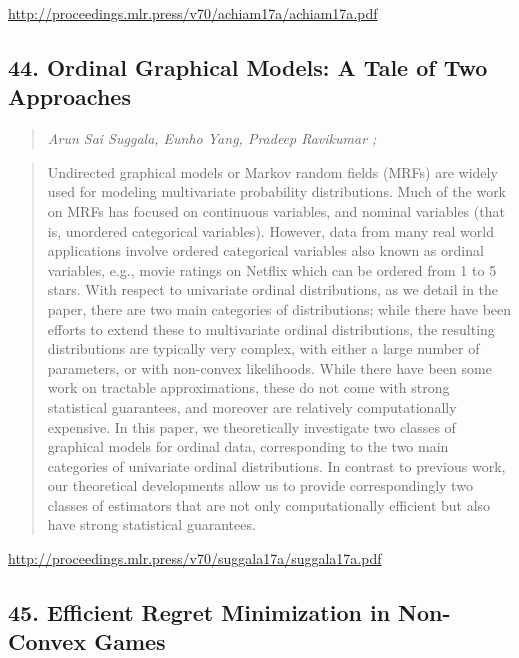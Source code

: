 \documentclass{article}
\begin{document}
\href{http://proceedings.mlr.press/v70/achiam17a/achiam17a.pdf}{http://proceedings.mlr.press/v70/achiam17a/achiam17a.pdf}

\subsection{44. Ordinal Graphical Models: A Tale of Two Approaches}

\begin{quote}
\footnotesize{\textit{Arun Sai Suggala, Eunho Yang, Pradeep Ravikumar ;}}

\end{quote}

\begin{quote}
    Undirected graphical models or Markov random fields (MRFs) are widely used for modeling multivariate probability distributions. Much of the work on MRFs has focused on continuous variables, and nominal variables (that is, unordered categorical variables). However, data from many real world applications involve ordered categorical variables also known as ordinal variables, e.g., movie ratings on Netflix which can be ordered from 1 to 5 stars. With respect to univariate ordinal distributions, as we detail in the paper, there are two main categories of distributions; while there have been efforts to extend these to multivariate ordinal distributions, the resulting distributions are typically very complex, with either a large number of parameters, or with non-convex likelihoods. While there have been some work on tractable approximations, these do not come with strong statistical guarantees, and moreover are relatively computationally expensive. In this paper, we theoretically investigate two classes of graphical models for ordinal data, corresponding to the two main categories of univariate ordinal distributions. In contrast to previous work, our theoretical developments allow us to provide correspondingly two classes of estimators that are not only computationally efficient but also have strong statistical guarantees.  
\end{quote}

\href{http://proceedings.mlr.press/v70/suggala17a/suggala17a.pdf}{http://proceedings.mlr.press/v70/suggala17a/suggala17a.pdf}

\subsection{45. Efficient Regret Minimization in Non-Convex Games}
\end{document}

